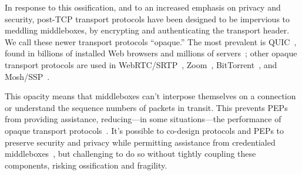 In response to this ossification, and to an increased emphasis on privacy and
security, post-TCP transport protocols have been designed to be impervious to
meddling middleboxes, by encrypting and authenticating the transport header. We
call these newer transport protocols ``opaque.'' The most prevalent is
QUIC~\cite{rfc9000}, found in billions of installed Web browsers and millions
of servers~\cite{zirngibl2021quicdeployment}; other opaque transport protocols
are used in WebRTC/SRTP~\cite{rfc8834webrtc}, Zoom~\cite
{zoom}, BitTorrent~\cite{bittorrent}, and Mosh/SSP~\cite{winstein2012mosh}.

This opacity means that middleboxes can't interpose themselves on a connection
or understand the sequence numbers of packets in transit.  This prevents PEPs
from providing assistance, reducing---in some situations---the performance of
opaque transport protocols~\cite
{border2020quicsat-presentation,kuhn2021quic-over-sat,martin2022bbr-quic-sat,border2020evaluating,kosek2022quicpep}.
It's possible to co-design protocols and PEPs to preserve security and privacy
while permitting assistance from credentialed middleboxes~\cite
{ford2008logjam,sherry2015blindbox, dogar2012tapa,iyengar2009flow}, but
challenging to do so without tightly coupling these components, risking
ossification and fragility.

